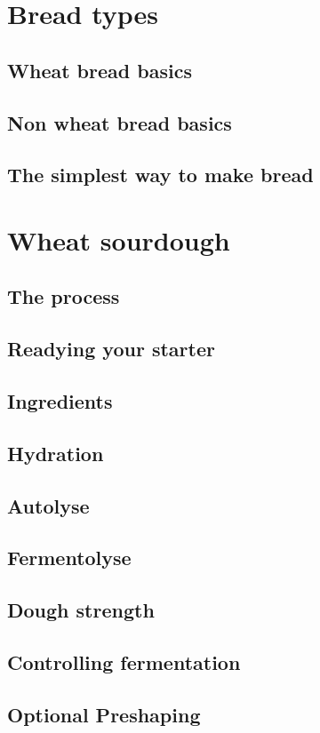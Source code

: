 \documentclass[a4paper, 12pt]{book}
\begin{document}
\chapter{Bread types}
\section{Wheat bread basics}
\section{Non wheat bread basics}
\section{The simplest way to make bread}

\chapter{Wheat sourdough}
\section{The process}
\section{Readying your starter}
\section{Ingredients}
\section{Hydration}
\section{Autolyse}
\section{Fermentolyse}
\section{Dough strength}
\section{Controlling fermentation}
\section{Optional Preshaping}
\end{document}

